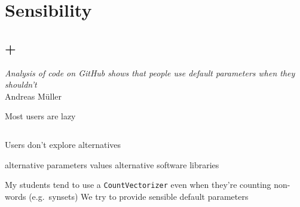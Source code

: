 \documentclass[aspectratio=169, 22pt]{beamer}
\newenvironment{sectionslide}
			{\subsection*{+}\begin{frame}[fragile,environment=sectionslide]\vfill\begin{center}\Large}
			{\end{center}\vfill\end{frame}}
\begin{document}
\section{Sensibility}

\begin{sectionslide}
	\emph{Analysis of code on GitHub shows that people use default parameters when they shouldn't} \\
	\raggedleft Andreas M\"uller
\end{sectionslide}

\begin{plain}{Most users are lazy}
	\begin{columns}[t]\begin{column}{.65\textwidth}
		\vspace{-2em}
	\begin{itemize}
	\p Users don't explore alternatives
	\begin{itemize}
		\p alternative parameters values
		\p alternative software libraries
	\end{itemize}
	\p My students tend to use a \verb|CountVectorizer| even when they're counting non-words (e.g.\ synsets)
	\p We try to provide sensible default parameters
	\end{itemize}
	\vfill
\end{column}
\begin{column}{.39\textwidth}
	\vspace*{-50pt}

\end{column}
\end{columns}
\end{plain}
\end{document}
